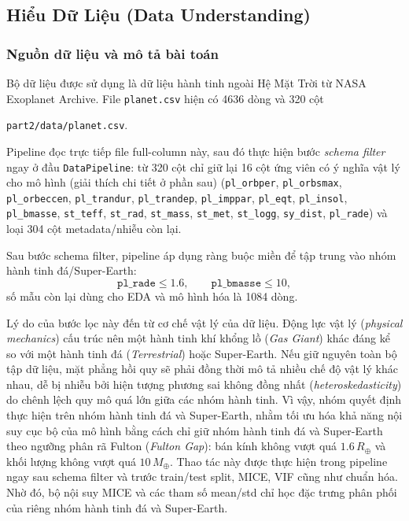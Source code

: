 \subsection{Hiểu Dữ Liệu (Data Understanding)}

\subsubsection{Nguồn dữ liệu và mô tả bài toán}
Bộ dữ liệu được sử dụng là dữ liệu hành tinh ngoài Hệ Mặt Trời từ NASA Exoplanet Archive.
File \texttt{planet.csv} hiện có 4636 dòng và 320 cột
\begin{center}
    \texttt{part2/data/planet.csv}.
\end{center}

Pipeline đọc trực tiếp file full-column này, sau đó thực hiện bước \emph{schema filter} ngay ở đầu
\texttt{DataPipeline}: từ 320 cột chỉ giữ lại 16 cột ứng viên có ý nghĩa vật lý cho mô hình (giải thích chi tiết ở phần sau)
(\texttt{pl\_orbper}, \texttt{pl\_orbsmax}, \texttt{pl\_orbeccen}, \texttt{pl\_trandur},
\texttt{pl\_trandep}, \texttt{pl\_imppar}, \texttt{pl\_eqt}, \texttt{pl\_insol},
\texttt{pl\_bmasse}, \texttt{st\_teff}, \texttt{st\_rad}, \texttt{st\_mass},
\texttt{st\_met}, \texttt{st\_logg}, \texttt{sy\_dist}, \texttt{pl\_rade}) và loại 304 cột metadata/nhiễu còn lại.

Sau bước schema filter, pipeline áp dụng ràng buộc miền để tập trung vào nhóm hành
tinh đá/Super-Earth:
\begin{equation}
    \texttt{pl\_rade} \le 1.6,\qquad \texttt{pl\_bmasse} \le 10,
\end{equation}
số mẫu còn lại dùng cho EDA và mô hình hóa là 1084 dòng.

Lý do của bước lọc này đến từ cơ chế vật lý của dữ liệu. Động lực vật lý
(\emph{physical mechanics}) cấu trúc nên một hành tinh khí khổng lồ
(\emph{Gas Giant}) khác đáng kể so với một hành tinh đá
(\emph{Terrestrial}) hoặc Super-Earth. Nếu giữ nguyên toàn bộ tập dữ liệu, mặt phẳng hồi quy sẽ
phải đồng thời mô tả nhiều chế độ vật lý khác nhau, dễ bị nhiễu bởi hiện tượng phương sai không
đồng nhất (\emph{heteroskedasticity}) do chênh lệch quy mô quá lớn giữa các nhóm hành tinh.
Vì vậy, nhóm quyết định thực hiện trên nhóm hành tinh đá và Super-Earth, nhằm tối ưu hóa khả năng nội suy
cục bộ của mô hình bằng cách chỉ giữ nhóm hành tinh đá và
Super-Earth theo ngưỡng phân rã Fulton (\emph{Fulton Gap}): bán kính không vượt quá
$1.6\,R_\oplus$ và khối lượng không vượt quá $10\,M_\oplus$. Thao tác này được thực hiện trong
pipeline ngay sau schema filter và trước train/test split, MICE, VIF cũng như chuẩn hóa. Nhờ đó,
bộ nội suy MICE và các tham số mean/std chỉ học đặc trưng phân phối của riêng nhóm hành tinh đá và
Super-Earth.

